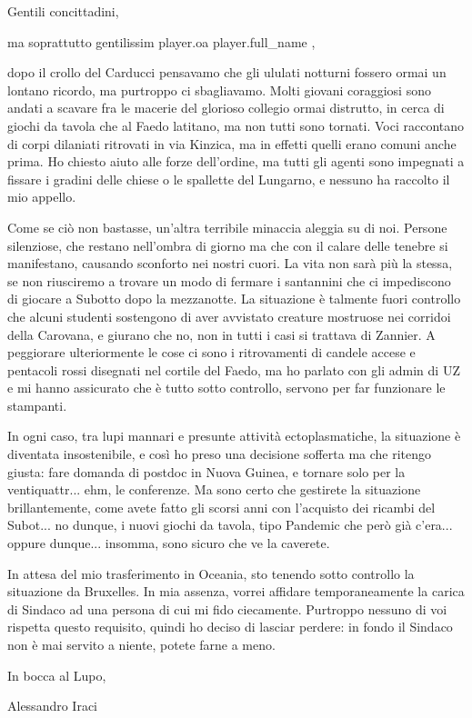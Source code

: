\documentclass{letter}
\date{26 novembre 2018}
\begin{document}
\begin{letter}{}
\opening{Gentili concittadini,}

ma soprattutto gentilissim{{ player.oa }} {{ player.full_name }},

dopo il crollo del Carducci pensavamo che gli ululati notturni fossero ormai un lontano ricordo, ma purtroppo ci sbagliavamo. Molti giovani coraggiosi sono andati a scavare fra le macerie del glorioso collegio ormai distrutto, in cerca di giochi da tavola che al Faedo latitano, ma non tutti sono tornati. Voci raccontano di corpi dilaniati ritrovati in via Kinzica, ma in effetti quelli erano comuni anche prima. Ho chiesto aiuto alle forze dell'ordine, ma tutti gli agenti sono impegnati a fissare i gradini delle chiese o le spallette del Lungarno, e nessuno ha raccolto il mio appello.

Come se ciò non bastasse, un'altra terribile minaccia aleggia su di noi. Persone silenziose, che restano nell'ombra di giorno ma che con il calare delle tenebre si manifestano, causando sconforto nei nostri cuori. La vita non sarà più la stessa, se non riusciremo a trovare un modo di fermare i santannini che ci impediscono di giocare a Subotto dopo la mezzanotte. La situazione è talmente fuori controllo che alcuni studenti sostengono di aver avvistato creature mostruose nei corridoi della Carovana, e giurano che no, non in tutti i casi si trattava di Zannier. A peggiorare ulteriormente le cose ci sono i ritrovamenti di candele accese e pentacoli rossi disegnati nel cortile del Faedo, ma ho parlato con gli admin di UZ e mi hanno assicurato che è tutto sotto controllo, servono per far funzionare le stampanti.

In ogni caso, tra lupi mannari e presunte attività ectoplasmatiche, la situazione è diventata insostenibile, e così ho preso una decisione sofferta ma che ritengo giusta: fare domanda di postdoc in Nuova Guinea, e tornare solo per la ventiquattr... ehm, le conferenze. Ma sono certo che gestirete la situazione brillantemente, come avete fatto gli scorsi anni con l'acquisto dei ricambi del Subot... no dunque, i nuovi giochi da tavola, tipo Pandemic che però già c'era... oppure dunque... insomma, sono sicuro che ve la caverete.

In attesa del mio trasferimento in Oceania, sto tenendo sotto controllo la situazione da Bruxelles. In mia assenza, vorrei affidare temporaneamente la carica di Sindaco ad una persona di cui mi fido ciecamente. Purtroppo nessuno di voi rispetta questo requisito, quindi ho deciso di lasciar perdere: in fondo il Sindaco non è mai servito a niente, potete farne a meno.

In bocca al Lupo,

\bigskip

\noindent Alessandro Iraci

\end{letter}
\end{document}
